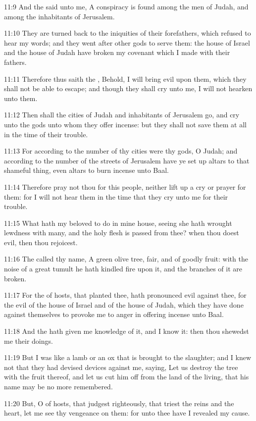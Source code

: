 11:9 And the \LORD said unto me, A conspiracy is found among the men of Judah, and among the inhabitants of Jerusalem.

11:10 They are turned back to the iniquities of their forefathers, which refused to hear my words; and they went after other gods to serve them: the house of Israel and the house of Judah have broken my covenant which I made with their fathers.

11:11 Therefore thus saith the \LORD, Behold, I will bring evil upon them, which they shall not be able to escape; and though they shall cry unto me, I will not hearken unto them.

11:12 Then shall the cities of Judah and inhabitants of Jerusalem go, and cry unto the gods unto whom they offer incense: but they shall not save them at all in the time of their trouble.

11:13 For according to the number of thy cities were thy gods, O Judah; and according to the number of the streets of Jerusalem have ye set up altars to that shameful thing, even altars to burn incense unto Baal.

11:14 Therefore pray not thou for this people, neither lift up a cry or prayer for them: for I will not hear them in the time that they cry unto me for their trouble.

11:15 What hath my beloved to do in mine house, seeing she hath wrought lewdness with many, and the holy flesh is passed from thee?  when thou doest evil, then thou rejoicest.

11:16 The \LORD called thy name, A green olive tree, fair, and of goodly fruit: with the noise of a great tumult he hath kindled fire upon it, and the branches of it are broken.

11:17 For the \LORD of hosts, that planted thee, hath pronounced evil against thee, for the evil of the house of Israel and of the house of Judah, which they have done against themselves to provoke me to anger in offering incense unto Baal.

11:18 And the \LORD hath given me knowledge of it, and I know it: then thou shewedst me their doings.

11:19 But I was like a lamb or an ox that is brought to the slaughter; and I knew not that they had devised devices against me, saying, Let us destroy the tree with the fruit thereof, and let us cut him off from the land of the living, that his name may be no more remembered.

11:20 But, O \LORD of hosts, that judgest righteously, that triest the reins and the heart, let me see thy vengeance on them: for unto thee have I revealed my cause.

